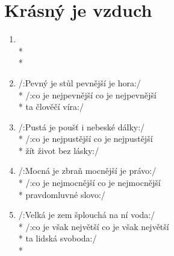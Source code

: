 \section{Krásný je vzduch}
\begin{enumerate}
\item \hspace{0em} \hspace*{0.75\textwidth} \\*
\hspace{0em} \hspace*{0.75\textwidth}\\*
\hspace{0em} \hspace*{0.75\textwidth}
\item /:Pevný je stůl pevnější je hora:/ \\*
/:co je nejpevnější co je nejpevnější \\*
ta člověčí víra:/ 
\item /:Pustá je poušť i nebeské dálky:/ \\*
/:co je nejpustější co je nejpustější \\*
žít život bez lásky:/ 
\item /:Mocná je zbraň mocnější je právo:/ \\*
/:co je nejmocnější co je nejmocnější \\*
pravdomluvné slovo:/ 
\item /:Velká je zem šplouchá na ní voda:/ \\*
/:co je však největší co je však největší \\*
ta lidská svoboda:/ \\*
\end{enumerate}
